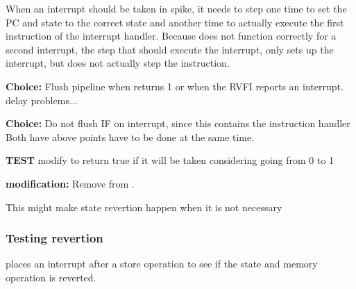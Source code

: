 When an interrupt should be taken in spike, it needs to step one time to set the PC and state to the correct state and another time to actually execute the first instruction of the interrupt handler. Because  does not function correctly for a second interrupt, the step that should execute the interrupt, only sets up the interrupt, but does not actually step the instruction.


\textbf{Choice:} Flush pipeline when  returns 1 or when the RVFI reports an interrupt. delay problems...

\textbf{Choice:} Do not flush IF on interrupt, since this contains the instruction handler
Both have above points have to be done at the same time.

\textbf{TEST} modify  to return true if it will be taken considering  going from 0 to 1

\textbf{modification:} Remove  from .

This might make state revertion happen when it is not necessary




\subsubsection{Testing revertion}

 places an interrupt after a store operation to see if the state and memory operation is reverted.

